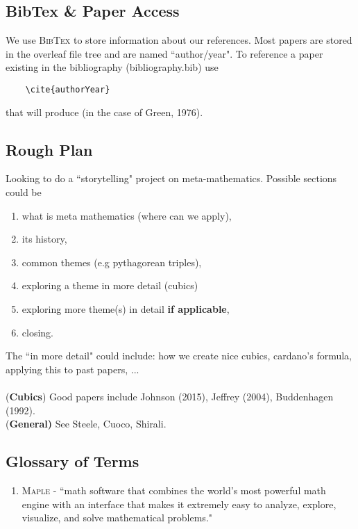 \documentclass[12pt]{article}
\begin{document}
\subsection{BibTex \& Paper Access}
We use \textsc{BibTex} to store information about our references. Most papers are stored in the overleaf file tree and are named ``author/year". To reference a paper existing in the bibliography (bibliography.bib) use
\begin{verbatim}
    \cite{authorYear}
\end{verbatim}
that will produce \cite{green1976} (in the case of Green, 1976).

\subsection{Rough Plan}
Looking to do a ``storytelling" project on meta-mathematics. Possible sections could be
\begin{enumerate}[itemsep=-2mm]
    \item what is meta mathematics (where can we apply),
    \item its history,
    \item common themes (e.g pythagorean triples),
    \item exploring a theme in more detail (cubics)
    \item exploring more theme(s) in detail \textbf{if applicable},
    \item closing.
\end{enumerate}

\noindent The ``in more detail" could include: how we create nice cubics, cardano's formula, applying this to past papers, ...\\\\
(\textbf{Cubics}) Good papers include Johnson (2015), Jeffrey (2004), Buddenhagen (1992).\\
(\textbf{General)} See Steele, Cuoco, Shirali.

\subsection{Glossary of Terms}
\begin{enumerate}[itemsep=-2mm]
    \item \textsc{Maple} - ``math software that combines the world's most powerful math engine with an interface that makes it extremely easy to analyze, explore, visualize, and solve mathematical problems."
\end{enumerate}
\end{document}
